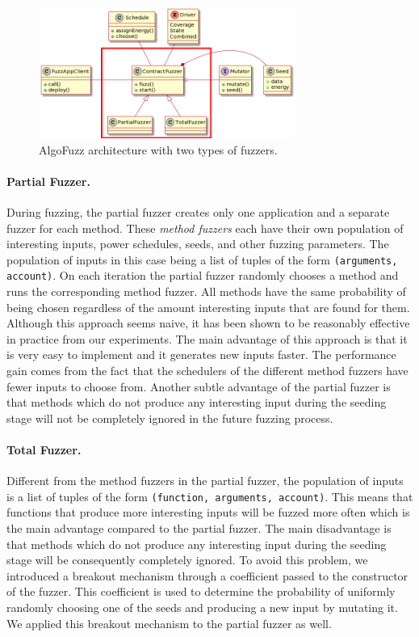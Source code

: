 \begin{figure}[htbp]
    \centering
    \includegraphics[width=0.75\textwidth]{figures/arc-fuzzers-r.png}
    \caption{AlgoFuzz architecture with two types of fuzzers.}\label{fig:architecture-fuzzers}
\end{figure}

\paragraph{Partial Fuzzer.} During fuzzing, the partial fuzzer creates only one application and a separate fuzzer for each method.
These \textit{method fuzzers} each have their own population of interesting inputs, power schedules, seeds, and other fuzzing parameters.
The population of inputs in this case being a list of tuples of the form \texttt{(arguments, account)}.
On each iteration the partial fuzzer randomly chooses a method and runs the corresponding method fuzzer.
All methods have the same probability of being chosen regardless of the amount interesting inputs that are found for them.
Although this approach seems naive, it has been shown to be reasonably effective in practice from our experiments.
The main advantage of this approach is that it is very easy to implement and it generates new inputs faster.
The performance gain comes from the fact that the schedulers of the different method fuzzers have fewer inputs to choose from.
Another subtle advantage of the partial fuzzer is that methods which do not produce any interesting input during the seeding stage will not be completely ignored in the future fuzzing process.

\paragraph{Total Fuzzer.} Different from the method fuzzers in the partial fuzzer, the population of inputs is a list of tuples of the form \texttt{(function, arguments, account)}.
This means that functions that produce more interesting inputs will be fuzzed more often which is the main advantage compared to the partial fuzzer.
The main disadvantage is that methods which do not produce any interesting input during the seeding stage will be consequently completely ignored.
To avoid this problem, we introduced a breakout mechanism through a coefficient passed to the constructor of the fuzzer.
This coefficient is used to determine the probability of uniformly randomly choosing one of the seeds and producing a new input by mutating it.
We applied this breakout mechanism to the partial fuzzer as well.



